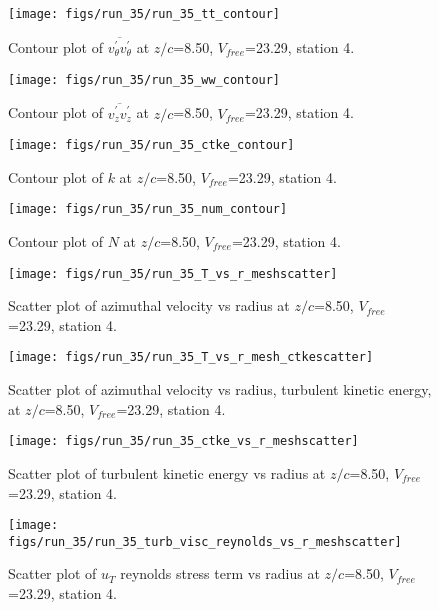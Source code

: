 \begin{figure}[H]
\centering
\texttt{[image: figs/run\_35/run\_35\_tt\_contour]}
\caption{Contour plot of $\overline{v_{\theta}^{\prime} v_{\theta}^{\prime}}$ at $z/c$=8.50, $V_{free}$=23.29, station 4.}
\end{figure}


\begin{figure}[H]
\centering
\texttt{[image: figs/run\_35/run\_35\_ww\_contour]}
\caption{Contour plot of $\overline{v_{z}^{\prime} v_{z}^{\prime}}$ at $z/c$=8.50, $V_{free}$=23.29, station 4.}
\end{figure}


\begin{figure}[H]
\centering
\texttt{[image: figs/run\_35/run\_35\_ctke\_contour]}
\caption{Contour plot of $k$ at $z/c$=8.50, $V_{free}$=23.29, station 4.}
\end{figure}


\begin{figure}[H]
\centering
\texttt{[image: figs/run\_35/run\_35\_num\_contour]}
\caption{Contour plot of $N$ at $z/c$=8.50, $V_{free}$=23.29, station 4.}
\end{figure}


\begin{figure}[H]
\centering
\texttt{[image: figs/run\_35/run\_35\_T\_vs\_r\_meshscatter]}
\caption{Scatter plot of azimuthal velocity vs radius at $z/c$=8.50, $V_{free}$=23.29, station 4.}
\end{figure}


\begin{figure}[H]
\centering
\texttt{[image: figs/run\_35/run\_35\_T\_vs\_r\_mesh\_ctkescatter]}
\caption{Scatter plot of azimuthal velocity vs radius, turbulent kinetic energy, at $z/c$=8.50, $V_{free}$=23.29, station 4.}
\end{figure}


\begin{figure}[H]
\centering
\texttt{[image: figs/run\_35/run\_35\_ctke\_vs\_r\_meshscatter]}
\caption{Scatter plot of turbulent kinetic energy vs radius at $z/c$=8.50, $V_{free}$=23.29, station 4.}
\end{figure}


\begin{figure}[H]
\centering
\texttt{[image: figs/run\_35/run\_35\_turb\_visc\_reynolds\_vs\_r\_meshscatter]}
\caption{Scatter plot of $
u_T$ reynolds stress term vs radius at $z/c$=8.50, $V_{free}$=23.29, station 4.}
\end{figure}


